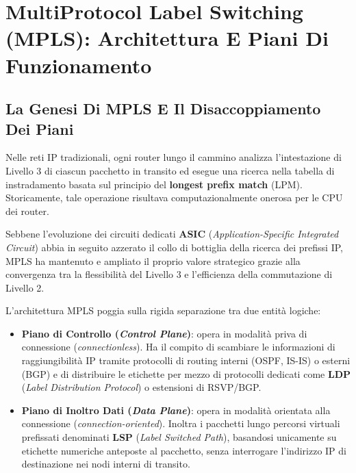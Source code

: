 \documentclass[11pt, a4paper]{article}
\begin{document}
\newpage

\section{MultiProtocol Label Switching (MPLS): Architettura E Piani Di Funzionamento}

\subsection{La Genesi Di MPLS E Il Disaccoppiamento Dei Piani}
Nelle reti IP tradizionali, ogni router lungo il cammino analizza l'intestazione di Livello 3 di ciascun pacchetto in transito ed esegue una ricerca nella tabella di instradamento basata sul principio del \textbf{longest prefix match} (LPM). Storicamente, tale operazione risultava computazionalmente onerosa per le CPU dei router.

Sebbene l'evoluzione dei circuiti dedicati \textbf{ASIC} (\emph{Application-Specific Integrated Circuit}) abbia in seguito azzerato il collo di bottiglia della ricerca dei prefissi IP, MPLS ha mantenuto e ampliato il proprio valore strategico grazie alla convergenza tra la flessibilità del Livello 3 e l'efficienza della commutazione di Livello 2.

L'architettura MPLS poggia sulla rigida separazione tra due entità logiche:
\begin{itemize}[noitemsep]
    \item \textbf{Piano di Controllo (\emph{Control Plane})}: opera in modalità priva di connessione (\emph{connectionless}). Ha il compito di scambiare le informazioni di raggiungibilità IP tramite protocolli di routing interni (OSPF, IS-IS) o esterni (BGP) e di distribuire le etichette per mezzo di protocolli dedicati come \textbf{LDP} (\emph{Label Distribution Protocol}) o estensioni di RSVP/BGP.
    \item \textbf{Piano di Inoltro Dati (\emph{Data Plane})}: opera in modalità orientata alla connessione (\emph{connection-oriented}). Inoltra i pacchetti lungo percorsi virtuali prefissati denominati \textbf{LSP} (\emph{Label Switched Path}), basandosi unicamente su etichette numeriche anteposte al pacchetto, senza interrogare l'indirizzo IP di destinazione nei nodi interni di transito.
\end{itemize}

\end{document}
